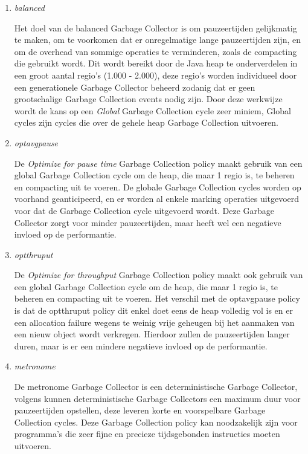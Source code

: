 \begin{enumerate}
    \item \textit{balanced}
    
            Het doel van de balanced Garbage Collector is om pauzeertijden gelijkmatig te maken, om te voorkomen dat er onregelmatige lange pauzeertijden zijn, en om de overhead van sommige operaties te verminderen, zoals de compacting die gebruikt wordt.
            Dit wordt bereikt door de Java heap te onderverdelen in een groot aantal regio's (1.000 - 2.000), deze regio's worden individueel door een generationele Garbage Collector beheerd zodanig dat er geen grootschalige Garbage Collection events nodig zijn.
            Door deze werkwijze wordt de kans op een \textit{Global} Garbage Collection cycle zeer miniem, Global cycles zijn cycles die over de gehele heap Garbage Collection uitvoeren.

    \item \textit{optavgpause}   
    
            De \textit{Optimize for pause time} Garbage Collection policy maakt gebruik van een global Garbage Collection cycle om de heap, die maar 1 regio is, te beheren en compacting uit te voeren.
            De globale Garbage Collection cycles worden op voorhand geanticipeerd, en er worden al enkele marking operaties uitgevoerd voor dat de Garbage Collection cycle uitgevoerd wordt.
            Deze Garbage Collector zorgt voor minder pauzeertijden, maar heeft wel een negatieve invloed op de performantie.
    
    \item \textit{optthruput}
    
            De \textit{Optimize for throughput} Garbage Collection policy maakt ook gebruik van een global Garbage Collection cycle om de heap, die maar 1 regio is, te beheren en compacting uit te voeren.
            Het verschil met de optavgpause policy is dat de optthruput policy dit enkel doet eens de heap volledig vol is en er een allocation failure wegens te weinig vrije geheugen bij het aanmaken van een nieuw object wordt verkregen.
            Hierdoor zullen de pauzeertijden langer duren, maar is er een mindere negatieve invloed op de performantie.
    \item \textit{metronome}
    
            De metronome Garbage Collector is een deterministische Garbage Collector, volgens \textcite{Oracle2008} kunnen deterministische Garbage Collectors een maximum duur voor pauzeertijden opstellen, deze leveren korte en voorspelbare Garbage Collection cycles.
            Deze Garbage Collection policy kan noodzakelijk zijn voor programma's die zeer fijne en precieze tijdsgebonden instructies moeten uitvoeren.
            

\end{enumerate}
